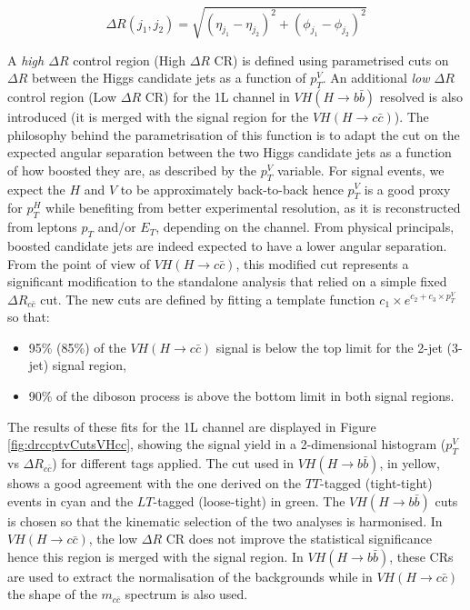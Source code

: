 \begin{equation}\label{eq-deltaR}
\Delta R(j_1, j_2) = \sqrt{(\eta_{j_1} - \eta_{j_2})^2 + (\phi_{j_1} - \phi_{j_2})^2 }
\end{equation}

A \textit{high $\Delta R$} control region (High $\Delta R$ CR) is defined using parametrised cuts on $\Delta R$ between the Higgs candidate jets as a function of $p_T^V$. An additional \textit{low $\Delta R$} control region (Low $\Delta R$ CR) for the 1L channel in $VH (H\rightarrow b\bar{b})$ resolved is also introduced (it is merged with the signal region for the $VH (H\rightarrow c\bar{c})$). The philosophy behind the parametrisation of this function is to adapt the cut on the expected angular separation between the two Higgs candidate jets as a function of how boosted they are, as described by the $p_T^V$ variable. For signal events, we expect the $H$ and $V$ to be approximately back-to-back hence $p_T^V$ is a good proxy for $p_T^H$ while benefiting from better experimental resolution, as it is reconstructed from leptons $p_T$ and/or $E_T$, depending on the channel. From physical principals, boosted candidate jets are indeed expected to have a lower angular separation. From the point of view of $VH (H\rightarrow c\bar{c})$, this modified cut represents a significant modification to the standalone analysis that relied on a simple fixed $\Delta R_{c\bar{c}}$ cut. The new cuts are defined by fitting a template function $ c_1 \times e^{c_2 + c_3 \times p_T^V}$ so that:   
\begin{itemize}
\item 95\% (85\%) of the $VH(H\rightarrow c\bar{c})$ signal is below the top limit for the 2-jet (3-jet) signal region,
\item 90\% of the diboson process is above the bottom limit in both signal regions.
\end{itemize}

The results of these fits for the 1L channel are displayed in Figure \ref{fig:drccptvCutsVHcc}, showing the signal yield in a 2-dimensional histogram ($p_T^V$ vs $\Delta R_{c\bar{c}}$) for different tags applied. The cut used in $VH(H\rightarrow b\bar{b})$, in yellow, shows a good agreement with the one derived on the $TT$-tagged (tight-tight) events in cyan and the $LT$-tagged (loose-tight) in green. The $VH(H\rightarrow b\bar{b})$ cuts is chosen so that the kinematic selection of the two analyses is harmonised. In $VH (H\rightarrow c\bar{c})$, the low $\Delta R$ CR does not improve the statistical significance hence this region is merged with the signal region. In $VH(H\rightarrow b\bar{b})$, these CRs are used to extract the normalisation of the backgrounds while in $VH (H\rightarrow c\bar{c})$ the shape of the $m_{c\bar{c}}$ spectrum is also used.  \\


